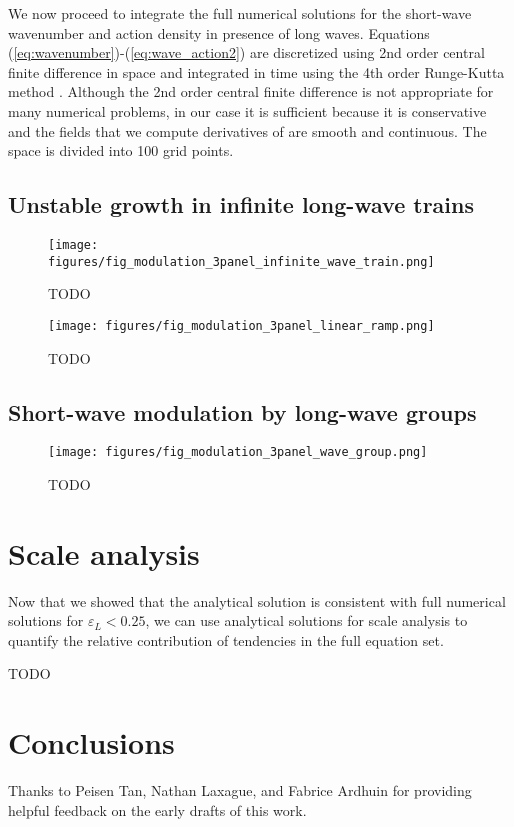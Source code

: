 \documentclass[draft]{agujournal2019}
\begin{document}
We now proceed to integrate the full numerical solutions for the short-wave
wavenumber and action density in presence of long waves.
Equations (\ref{eq:wavenumber})-(\ref{eq:wave_action2}) are discretized using
2nd order central finite difference in space and integrated in time using the
4th order Runge-Kutta method \cite{butcher1996runge}.
Although the 2nd order central finite difference is not appropriate for many
numerical problems, in our case it is sufficient because it is conservative and
the fields that we compute derivatives of are smooth and continuous.
The space is divided into 100 grid points.

\subsection{Unstable growth in infinite long-wave trains}
\label{subsection:unstable_growth}

\begin{figure}[h]
\label{fig:frequency_modulation}
\centering
\texttt{[image: figures/fig\_modulation\_3panel\_infinite\_wave\_train.png]}
\caption{
  TODO
}
\end{figure}

\begin{figure}[h]
\label{fig:frequency_modulation}
\centering
\texttt{[image: figures/fig\_modulation\_3panel\_linear\_ramp.png]}
\caption{
  TODO
}
\end{figure}

\subsection{Short-wave modulation by long-wave groups}
\label{subsection:wave_groups}

\begin{figure}[h]
\label{fig:frequency_modulation}
\centering
\texttt{[image: figures/fig\_modulation\_3panel\_wave\_group.png]}
\caption{
  TODO
}
\end{figure}



\section{Scale analysis}
\label{section:scale_analysis}

Now that we showed that the analytical solution is consistent with full numerical
solutions for $\varepsilon_L < 0.25$, we can use analytical solutions for scale
analysis to quantify the relative contribution of tendencies in the full equation set.

TODO

\section{Conclusions}

\acknowledgments
Thanks to Peisen Tan, Nathan Laxague, and Fabrice Ardhuin for providing helpful
feedback on the early drafts of this work.


\end{document}
